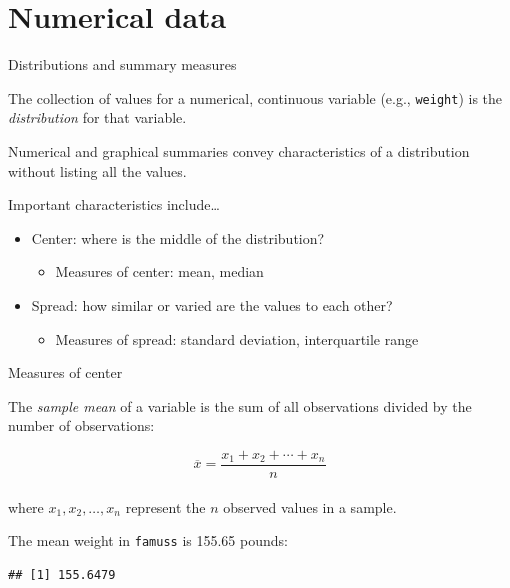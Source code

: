 \documentclass[
  ignorenonframetext,
]{beamer}
\newenvironment{Shaded}{\begin{snugshade}}{\end{snugshade}}
\newcommand{\KeywordTok}[1]{\textcolor[rgb]{0.13,0.29,0.53}{\textbf{#1}}}
\newcommand{\NormalTok}[1]{#1}
\newcommand{\OperatorTok}[1]{\textcolor[rgb]{0.81,0.36,0.00}{\textbf{#1}}}
\providecommand{\tightlist}{%
  \setlength{\itemsep}{0pt}\setlength{\parskip}{0pt}}
\begin{document}
\hypertarget{numerical-data}{%
\section{Numerical data}\label{numerical-data}}

\begin{frame}{Distributions and summary measures}
\protect\hypertarget{distributions-and-summary-measures}{}

The collection of values for a numerical, continuous variable (e.g.,
\texttt{weight}) is the \emph{distribution} for that variable.

Numerical and graphical summaries convey characteristics of a
distribution without listing all the values.

Important characteristics include\ldots{}

\begin{itemize}
\tightlist
\item
  Center: where is the middle of the distribution?

  \begin{itemize}
  \tightlist
  \item
    Measures of center: mean, median
  \end{itemize}
\item
  Spread: how similar or varied are the values to each other?

  \begin{itemize}
  \tightlist
  \item
    Measures of spread: standard deviation, interquartile range
  \end{itemize}
\end{itemize}

\end{frame}

\begin{frame}[fragile]{Measures of center}
\protect\hypertarget{measures-of-center}{}

The \emph{sample mean} of a variable is the sum of all observations
divided by the number of observations:

\[\overline{x} = \frac{x_1+x_2+\cdots+x_n}{n}\]\\
where \(x_1, x_2, \ldots, x_n\) represent the \(n\) observed values in a
sample.

The mean weight in \texttt{famuss} is 155.65 pounds:

\scriptsize

\begin{Shaded}
\end{Shaded}

\begin{verbatim}
## [1] 155.6479
\end{verbatim}

\normalsize

\end{frame}
\end{document}
